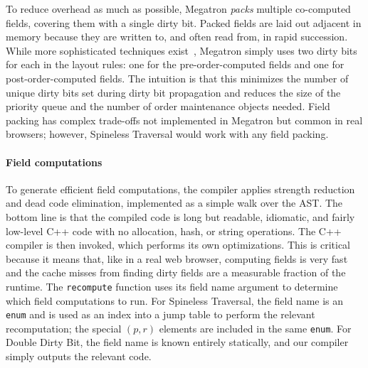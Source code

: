 To reduce overhead as much as possible,
  Megatron \emph{packs} multiple co-computed fields,
  covering them with a single dirty bit.
Packed fields are laid out adjacent in memory
  because they are written to, and often read from,
  in rapid succession.
While more sophisticated techniques exist~\cite{yufeng-2},
  Megatron simply uses two dirty bits
  for each in the layout rules:
  one for the pre-order-computed fields
  and one for post-order-computed fields.
The intuition is that this minimizes
  the number of unique dirty bits
  set during dirty bit propagation
  and reduces the size of the priority queue
  and the number of order maintenance objects needed.
Field packing has complex trade-offs
  not implemented in Megatron
  but common in real browsers;
  however, Spineless Traversal would work
  with any field packing.

\paragraph{Field computations}
To generate efficient field computations,
  the compiler applies strength reduction and dead code elimination,
  implemented as a simple walk over the AST.
The bottom line is that the compiled code is
  long but readable, idiomatic, and fairly low-level C++ code
  with no allocation, hash, or string operations.
The C++ compiler is then invoked, which performs its own optimizations.
This is critical because it means that,
  like in a real web browser,
  computing fields is very fast
  and the cache misses from finding dirty fields
  are a measurable fraction of the runtime.
The \texttt{recompute} function uses its field name argument
  to determine which field computations to run.
For Spineless Traversal,
  the field name is an \texttt{enum}
  and is used as an index into a jump table
  to perform the relevant recomputation;
  the special $(p, r)$ elements are included
  in the same \texttt{enum}.
For Double Dirty Bit, the field name is known
  entirely statically, and our compiler
  simply outputs the relevant code.